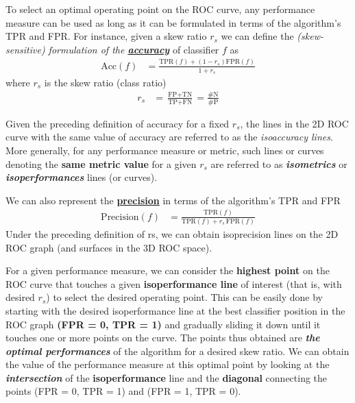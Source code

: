 \documentclass[11pt]{article}
\begin{document}
To select an optimal operating point on the ROC curve, any performance measure can be used as long as it can be formulated in terms of the algorithm’s TPR and FPR. For instance, given a skew ratio $r_s$ we can define the \emph{(skew-sensitive) formulation of the \underline{\textbf{accuracy}}} of classifier $f$ as
\begin{align}
\text{Acc}(f) &= \frac{\text{TPR}(f) + (1 - r_s) \text{FPR}(f) }{1 + r_s}\label{eqn: skew_accuracy}
\end{align} where $r_s$ is the skew ratio (class ratio)
\begin{align*}
r_s &= \frac{\text{FP} + \text{TN}}{\text{TP} + \text{FN}} = \frac{\#\text{N}}{\#\text{P}}
\end{align*}

Given the preceding definition of accuracy for a fixed $r_s$, the lines in the 2D ROC curve with the same value of accuracy are referred to as the \emph{isoaccuracy lines}. More generally, for any performance measure or metric, such lines or curves denoting the \textbf{same metric value} for a given $r_s$ are referred to as \emph{\textbf{isometrics}} or \emph{\textbf{isoperformances}} lines (or curves). 




We can also represent the \underline{\textbf{precision}} in terms of the algorithm’s TPR and FPR
\begin{align}
\text{Precision}(f) &= \frac{\text{TPR}(f)}{\text{TPR}(f) + r_{s}\,\text{FPR}(f)} \label{eqn: skew_precision}
\end{align} Under the preceding definition of rs, we can obtain isoprecision lines on the 2D
ROC graph (and surfaces in the 3D ROC space).

For a given performance measure, we can consider the \textbf{highest point} on the ROC curve that touches a given \textbf{isoperformance line} of interest (that is, with desired $r_s$) to select the desired operating point. This can be easily done by starting with the desired isoperformance line at the best classifier position in the
ROC graph \textbf{(FPR = 0, TPR = 1)} and gradually sliding it down until it touches one or more points on the curve. The points thus obtained are \emph{\textbf{the optimal
performances}} of the algorithm for a desired skew ratio. We can obtain the value of the performance measure at this optimal point by looking at the \emph{\textbf{intersection}} of the \textbf{isoperformance} line and the \textbf{diagonal} connecting the points (FPR = 0, TPR = 1) and (FPR = 1, TPR = 0). 
\end{document}
